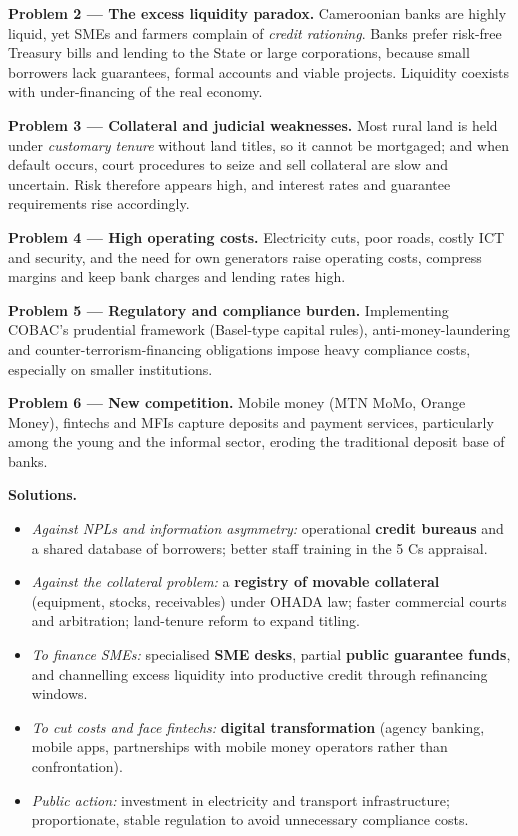 \documentclass[11pt]{article}
\begin{document}
\begin{corrige}
\textbf{Problem 2 — The excess liquidity paradox.} Cameroonian banks are highly liquid, yet SMEs and farmers complain of \emph{credit rationing}. Banks prefer risk-free Treasury bills and lending to the State or large corporations, because small borrowers lack guarantees, formal accounts and viable projects. Liquidity coexists with under-financing of the real economy.

\textbf{Problem 3 — Collateral and judicial weaknesses.} Most rural land is held under \emph{customary tenure} without land titles, so it cannot be mortgaged; and when default occurs, court procedures to seize and sell collateral are slow and uncertain. Risk therefore appears high, and interest rates and guarantee requirements rise accordingly.

\textbf{Problem 4 — High operating costs.} Electricity cuts, poor roads, costly ICT and security, and the need for own generators raise operating costs, compress margins and keep bank charges and lending rates high.

\textbf{Problem 5 — Regulatory and compliance burden.} Implementing COBAC's prudential framework (Basel-type capital rules), anti-money-laundering and counter-terrorism-financing obligations impose heavy compliance costs, especially on smaller institutions.

\textbf{Problem 6 — New competition.} Mobile money (MTN MoMo, Orange Money), fintechs and MFIs capture deposits and payment services, particularly among the young and the informal sector, eroding the traditional deposit base of banks.

\textbf{Solutions.}
\begin{itemize}
\item \emph{Against NPLs and information asymmetry:} operational \textbf{credit bureaus} and a shared database of borrowers; better staff training in the 5 Cs appraisal.
\item \emph{Against the collateral problem:} a \textbf{registry of movable collateral} (equipment, stocks, receivables) under OHADA law; faster commercial courts and arbitration; land-tenure reform to expand titling.
\item \emph{To finance SMEs:} specialised \textbf{SME desks}, partial \textbf{public guarantee funds}, and channelling excess liquidity into productive credit through refinancing windows.
\item \emph{To cut costs and face fintechs:} \textbf{digital transformation} (agency banking, mobile apps, partnerships with mobile money operators rather than confrontation).
\item \emph{Public action:} investment in electricity and transport infrastructure; proportionate, stable regulation to avoid unnecessary compliance costs.
\end{itemize}


\end{corrige}
\end{document}
